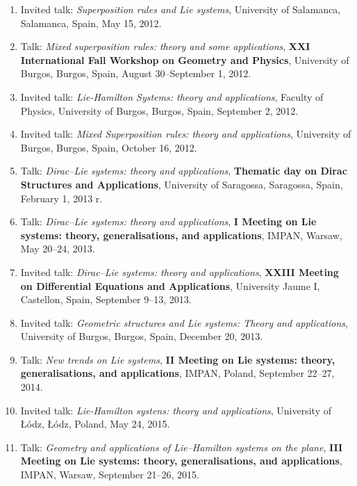 \documentclass[12pt,reqno]{amsbook}
\begin{document}
\begin{enumerate}
\item Invited talk: {\it Superposition rules and Lie systems}, University of Salamanca, Salamanca, Spain, May 15, 2012.

\item Talk: {\it Mixed superposition rules: theory and some applications}, {\bf XXI International Fall Workshop on Geometry and Physics}, University of  Burgos, Burgos, Spain, August 30--September 1, 2012.
\item Invited talk: {\it Lie-Hamilton Systems: theory and applications}, Faculty of Physics,  University of  Burgos, Burgos, Spain, September 2, 2012.

\item Invited talk: {\it Mixed Superposition rules: theory and applications}, University of  Burgos, Burgos, Spain, October 16, 2012.

\item Talk: {\it Dirac--Lie systems: theory and applications}, {\bf Thematic day on Dirac Structures and Applications}, University of Saragossa, Saragossa, Spain, February 1, 2013 r.

\item Talk: {\it Dirac--Lie systems: theory and applications}, {\bf  I Meeting on Lie systems: theory, generalisations, and applications}, IMPAN, Warsaw, May 20--24, 2013.

\item Invited talk: {\it Dirac--Lie systems: theory and applications}, {\bf  XXIII Meeting on Differential Equations and Applications}, University Jaume I, Castellon, Spain, September 9--13, 2013.

\item  Invited talk: {\it Geometric structures and Lie systems: Theory and applications},  University of Burgos, Burgos, Spain, December 20, 2013.

\item Talk: {\it New trends on Lie systems}, {\bf  II Meeting on Lie systems: theory, generalisations, and applications}, IMPAN, Poland, September 22--27, 2014.

\item Invited talk: {\it Lie-Hamilton systens: theory and applications}, University of \L \'odz, \L\'odz, Poland, May  24, 2015.

\item Talk: {\it Geometry and applications of Lie--Hamilton systems on the plane}, {\bf  III Meeting on Lie systems: theory, generalisations, and applications}, IMPAN, Warsaw, September 21--26, 2015.


\end{enumerate}
\end{document}
